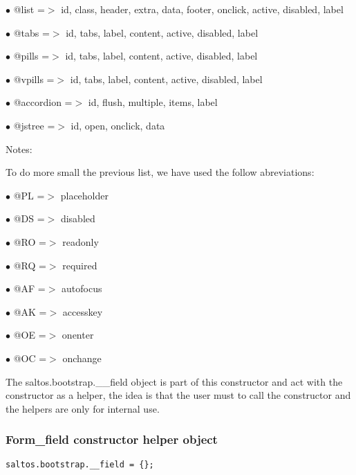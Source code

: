 \documentclass[a4paper]{article}
\begin{document}
\begin{compactitem}
\item[\color{myblue}$\bullet$] @list        =$>$ id, class, header, extra, data, footer, onclick, active, disabled, label
\item[\color{myblue}$\bullet$] @tabs        =$>$ id, tabs, label, content, active, disabled, label
\item[\color{myblue}$\bullet$] @pills       =$>$ id, tabs, label, content, active, disabled, label
\item[\color{myblue}$\bullet$] @vpills      =$>$ id, tabs, label, content, active, disabled, label
\item[\color{myblue}$\bullet$] @accordion   =$>$ id, flush, multiple, items, label
\item[\color{myblue}$\bullet$] @jstree      =$>$ id, open, onclick, data
\end{compactitem}

Notes:

To do more small the previous list, we have used the follow abreviations:

\begin{compactitem}
\item[\color{myblue}$\bullet$] @PL =$>$ placeholder
\item[\color{myblue}$\bullet$] @DS =$>$ disabled
\item[\color{myblue}$\bullet$] @RO =$>$ readonly
\item[\color{myblue}$\bullet$] @RQ =$>$ required
\item[\color{myblue}$\bullet$] @AF =$>$ autofocus
\item[\color{myblue}$\bullet$] @AK =$>$ accesskey
\item[\color{myblue}$\bullet$] @OE =$>$ onenter
\item[\color{myblue}$\bullet$] @OC =$>$ onchange
\end{compactitem}

The saltos.bootstrap.\_\_field object is part of this constructor and act with the constructor
as a helper, the idea is that the user must to call the constructor and the helpers are
only for internal use.

\hypertarget{toc602}{}
\subsubsection{Form\_field constructor helper object}

\begin{lstlisting}
saltos.bootstrap.__field = {};
\end{lstlisting}
\end{document}
